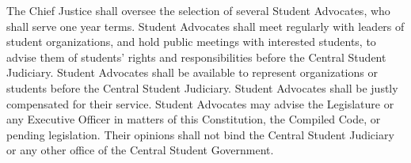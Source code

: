     The Chief Justice shall oversee the selection of several Student Advocates, who shall serve one year terms. Student Advocates shall meet regularly with leaders of student organizations, and hold public meetings with interested students, to advise them of students' rights and responsibilities before the Central Student Judiciary. Student Advocates shall be available to represent organizations or students before the Central Student Judiciary. Student Advocates shall be justly compensated for their service. Student Advocates may advise the Legislature or any Executive Officer in matters of this Constitution, the Compiled Code, or pending legislation. Their opinions shall not bind the Central Student Judiciary or any other office of the Central Student Government.